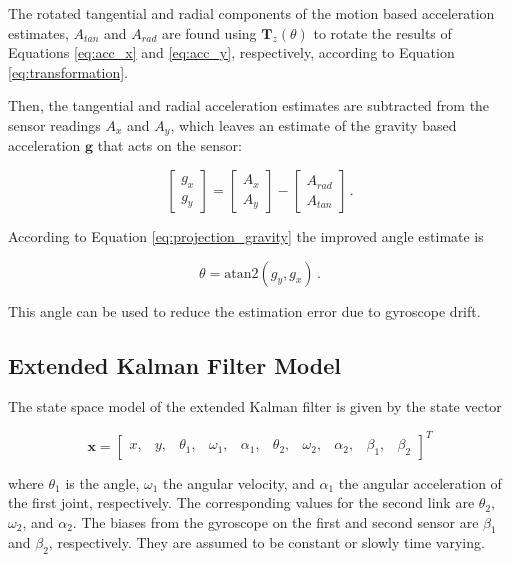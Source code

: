 \noindent
The rotated tangential and radial components of the motion based acceleration estimates, $A_{tan}$ and $A_{rad}$ are found using $\mathbf{T}_z(\theta)$ to rotate the results of Equations \ref{eq:acc_x} and \ref{eq:acc_y}, respectively, according to Equation \ref{eq:transformation}.

Then, the tangential and radial acceleration estimates are subtracted from the sensor readings $A_x$ and $A_y$, which leaves an estimate of the gravity based acceleration $\mathbf{g}$ that acts on the sensor:

\begin{equation}
\begin{bmatrix}
    g_x \\
    g_y 
    \end{bmatrix} = 
    \begin{bmatrix}
    A_x \\
    A_y 
    \end{bmatrix} -
    \begin{bmatrix}
    A_{rad} \\
    A_{tan} 
    \end{bmatrix}\,.
\end{equation}

\noindent
According to Equation \ref{eq:projection_gravity} the improved angle estimate is

\begin{equation}
  \theta = \mbox{atan}2(g_y, g_x)\,.
\end{equation}

\noindent
This angle can be used to reduce the estimation error due to gyroscope drift.

\subsection{Extended Kalman Filter Model}

The state space model of the extended Kalman filter is given by the state vector

\begin{equation} \label{eq:state_vector}
  \mathbf{x} = \begin{bmatrix}
  	x, & y, & \theta_1, & \omega_1, & \alpha_1, & \theta_2, & \omega_2, & \alpha_2, & \beta_1, & \beta_2
  \end{bmatrix}^T
\end{equation}

where $\theta_1$ is the angle, $\omega_1$ the angular velocity, and $\alpha_1$ the angular acceleration of the first joint, respectively. The corresponding values for the second link are $\theta_2$, $\omega_2$, and $\alpha_2$. The biases from the gyroscope on the first and second sensor are $\beta_1$ and $\beta_2$, respectively. They are assumed to be constant or slowly time varying.

